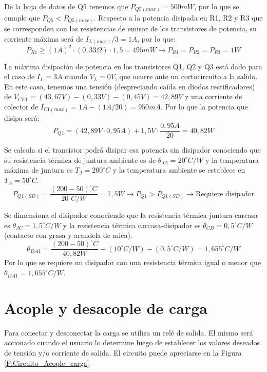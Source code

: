 De la hoja de datos de Q5 tenemos que $P_{Q5(max)}=500mW$, por lo que se cumple que $P_{Q5}<P_{Q5(max)}$. Respecto a la potencia disipada en R1, R2 y R3 que se corresponden con las resistencias de emisor de los transistores de potencia, su corriente máxima será de $I_{L(max)}/3=1A$, por lo que:
\begin{equation}
P_{R1}\geq (1A)^2\cdot (0,33\Omega)\cdot 1,5=495 mW \to P_{R1}=P_{R2}=P_{R3}=1W
\end{equation}\par 
La máxima disipación de potencia en los transistores Q1, Q2 y Q3 está dado para el caso de $I_L=3A$ cuando $V_L=0V$, que ocurre ante un cortocircuito a la salida. En este caso, tenemos una tensión (despreciando caída en diodos rectificadores) de $V_{CE1} = (43,67 V)-(0,33 V)-(0,45 V)=42,89 V$ y una corriente de colector de $I_{C1(max)}=1 A-(1A/20)=950mA$. Por lo que la potencia que disipa será:
\begin{equation}
P_{Q1}=(42,89V\cdot 0,95A)+1,5V\cdot \frac{0,95A}{20}=40,82 W
\end{equation}\par 
Se calcula si el transistor podrá disipar esa potencia sin disipador conociendo que su resistencia térmica de juntura-ambiente es de $\theta _{JA}=20^\circ C/W$ y la temperatura máxima de juntura es $T_J=200^\circ C$ y la temperatura ambiente se establece en $T_A=50^\circ C$.
\begin{equation}
P_{Q1(SD)}=\frac{(200-50)^\circ C}{20^\circ C/W}=7,5W \to P_{Q1}>P_{Q1(SD)} \to \text{Requiere disipador}
\end{equation} \par 
Se dimensiona el disipador conociendo que la resistencia térmica juntura-carcasa es $\theta_{JC}=1,5^\circ C/W$ y la resistencia térmica carcasa-disipador es $\theta_{CD}=0,5^\circ C/W$ (contacto con grasa y arandela de mica).
\begin{equation}
\theta_{DA1}=\frac{(200-50)^\circ C}{40,82 W}-(10^\circ C/W)-(0,5^\circ C/W)=1,655^\circ C/W
\end{equation}
Por lo que se requiere un disipador con una resistencia térmica igual o menor que $\theta_{DA1}=1,655^\circ C/W$.

\section{Acople y desacople de carga}
Para conectar y desconectar la carga se utiliza un relé de salida. El mismo será accionado cuando el usuario lo determine luego de establecer los valores deseados de tensión y/o corriente de salida. El circuito puede apreciarse en la Figura \ref{F:Circuito_Acople_carga}.

